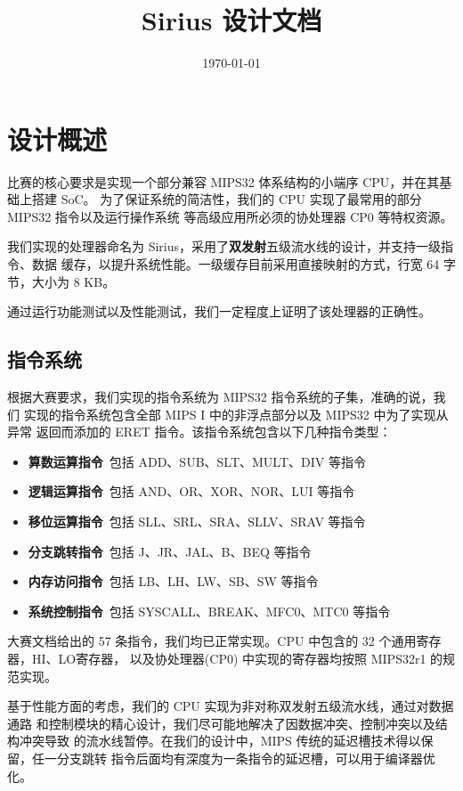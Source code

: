 \documentclass[blue,normal,cn]{elegantbook}
\title{Sirius 设计文档}
\date{\today}
\begin{document}
\tableofcontents
\mainmatter

\chapter{设计概述}

比赛的核心要求是实现一个部分兼容 MIPS32 体系结构的小端序 CPU，并在其基础上搭建 SoC。
为了保证系统的简洁性，我们的 CPU 实现了最常用的部分 MIPS32 指令以及运行操作系统
等高级应用所必须的协处理器 CP0 等特权资源。

我们实现的处理器命名为 Sirius，采用了\textbf{双发射}五级流水线的设计，并支持一级指令、数据
缓存，以提升系统性能。一级缓存目前采用直接映射的方式，行宽 64 字节，大小为 8 KB。

通过运行功能测试以及性能测试，我们一定程度上证明了该处理器的正确性。

\section{指令系统}

根据大赛要求，我们实现的指令系统为 MIPS32 指令系统的子集，准确的说，我们
实现的指令系统包含全部 MIPS I 中的非浮点部分以及 MIPS32 中为了实现从异常
返回而添加的 ERET 指令。该指令系统包含以下几种指令类型：

\begin{itemize}
    \item \textbf{算数运算指令}\ 包括 ADD、SUB、SLT、MULT、DIV 等指令
    \item \textbf{逻辑运算指令}\ 包括 AND、OR、XOR、NOR、LUI 等指令
    \item \textbf{移位运算指令}\ 包括 SLL、SRL、SRA、SLLV、SRAV 等指令
    \item \textbf{分支跳转指令}\ 包括 J、JR、JAL、B、BEQ 等指令
    \item \textbf{内存访问指令}\ 包括 LB、LH、LW、SB、SW 等指令
    \item \textbf{系统控制指令}\ 包括 SYSCALL、BREAK、MFC0、MTC0 等指令
\end{itemize}

大赛文档给出的 57 条指令，我们均已正常实现。CPU 中包含的 32 个通用寄存器，HI、LO寄存器，
以及协处理器(CP0) 中实现的寄存器均按照 MIPS32r1 的规范实现。

基于性能方面的考虑，我们的 CPU 实现为非对称双发射五级流水线，通过对数据通路
和控制模块的精心设计，我们尽可能地解决了因数据冲突、控制冲突以及结构冲突导致
的流水线暂停。在我们的设计中，MIPS 传统的延迟槽技术得以保留，任一分支跳转
指令后面均有深度为一条指令的延迟槽，可以用于编译器优化。
\end{document}
